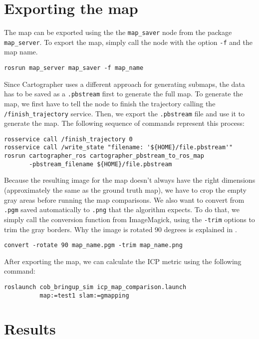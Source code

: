 \section{Exporting the map}

The map can be exported using the the \texttt{map\_saver} node from the package \texttt{map\_server}. To export the map, simply call the node with the option \texttt{-f} and the map name.

\begin{verbatim}
rosrun map_server map_saver -f map_name
\end{verbatim}

Since Cartographer uses a different approach for generating submaps, the data has to be saved as a \texttt{.pbstream} first to generate the full map. To generate the map, we first have to tell the node to finish the trajectory calling the \texttt{/finish\_trajectory} service. Then, we export the \texttt{.pbstream} file and use it to generate the map. The following sequence of commands represent this process:

\begin{verbatim}
rosservice call /finish_trajectory 0
rosservice call /write_state "filename: '${HOME}/file.pbstream'"
rosrun cartographer_ros cartographer_pbstream_to_ros_map 
       -pbstream_filename ${HOME}/file.pbstream
\end{verbatim}

Because the resulting image for the map doesn't always have the right dimensions (approximately the same as the ground truth map), we have to crop the empty gray areas before running the map comparisons. We also want to convert from \texttt{.pgm} saved automatically to \texttt{.png} that the algorithm expects. To do that, we simply call the conversion function from ImageMagick, using the \texttt{-trim} options to trim the gray borders. Why the image is rotated 90 degrees is explained in .

\begin{verbatim}
convert -rotate 90 map_name.pgm -trim map_name.png
\end{verbatim}

After exporting the map, we can calculate the ICP metric using the following command:

\begin{verbatim}
roslaunch cob_bringup_sim icp_map_comparison.launch 
          map:=test1 slam:=gmapping
\end{verbatim}

\section{Results}

